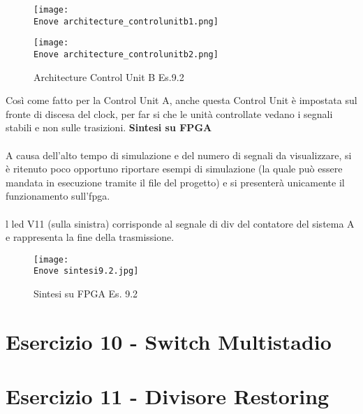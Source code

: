 \documentclass[12pt]{article}
\def \Enove {Allegati/Esercizio9/}
\begin{document}
\clearpage
\begin{figure}[ht!]
    \texttt{[image: \\Enove architecture\_controlunitb1.png]}
\end{figure}
\begin{figure}[ht!]
    \texttt{[image: \\Enove architecture\_controlunitb2.png]}
    \caption{Architecture Control Unit B Es.9.2}
\end{figure}
Così come fatto per la Control Unit A, anche questa Control Unit è impostata sul fronte di discesa del clock, per far si che le unità controllate vedano i segnali stabili e non sulle trasizioni.
\clearpage
{\large \textbf{Sintesi su FPGA}}
\\\\A causa dell’alto tempo di simulazione e del numero di segnali da visualizzare, si è ritenuto poco opportuno riportare esempi di simulazione (la quale può essere mandata in esecuzione tramite il file del progetto) e si presenterà unicamente il funzionamento sull’fpga.
\\\\l led V11 (sulla sinistra) corrisponde al segnale di div del contatore del sistema A e rappresenta la fine della trasmissione.
\begin{figure}[ht!]
    \centering
    \texttt{[image: \\Enove sintesi9.2.jpg]}
    \caption{Sintesi su FPGA Es. 9.2}
\end{figure}
\clearpage
\section{Esercizio 10 - Switch Multistadio}
\newpage
\section{Esercizio 11 - Divisore Restoring}
\end{document}
